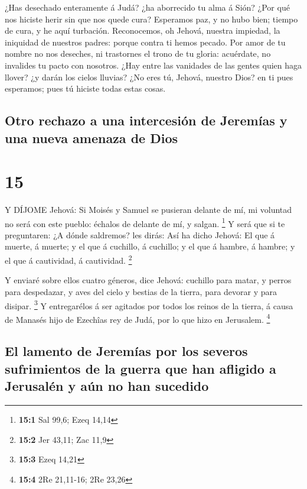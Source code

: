  ¿Has desechado enteramente á Judá? ¿ha aborrecido tu alma
á Sión? ¿Por qué nos hiciste herir sin que nos quede cura? Esperamos
paz, y no hubo bien; tiempo de cura, y he aquí turbación. 
Reconocemos, oh Jehová, nuestra impiedad, la iniquidad de nuestros
padres: porque contra ti hemos pecado.  Por amor de tu
nombre no nos deseches, ni trastornes el trono de tu gloria: acuérdate,
no invalides tu pacto con nosotros.  ¿Hay entre las
vanidades de las gentes quien haga llover? ¿y darán los cielos lluvias?
¿No eres tú, Jehová, nuestro Dios? en ti pues esperamos; pues tú hiciste
todas estas cosas.

\hypertarget{otro-rechazo-a-una-intercesiuxf3n-de-jeremuxedas-y-una-nueva-amenaza-de-dios}{%
\subsection{Otro rechazo a una intercesión de Jeremías y una nueva
amenaza de
Dios}\label{otro-rechazo-a-una-intercesiuxf3n-de-jeremuxedas-y-una-nueva-amenaza-de-dios}}

\hypertarget{section-14}{%
\section{15}\label{section-14}}

 Y DÍJOME Jehová: Si Moisés y Samuel se pusieran delante de
mí, mi voluntad no será con este pueblo: échalos de delante de mí, y
salgan. \footnote{\textbf{15:1} Sal 99,6; Ezeq 14,14}  Y
será que si te preguntaren: ¿A dónde saldremos? les dirás: Así ha dicho
Jehová: El que á muerte, á muerte; y el que á cuchillo, á cuchillo; y el
que á hambre, á hambre; y el que á cautividad, á cautividad. \footnote{\textbf{15:2}
  Jer 43,11; Zac 11,9}

 Y enviaré sobre ellos cuatro géneros, dice Jehová: cuchillo
para matar, y perros para despedazar, y aves del cielo y bestias de la
tierra, para devorar y para disipar. \footnote{\textbf{15:3} Ezeq 14,21}
 Y entregarélos á ser agitados por todos los reinos de la
tierra, á causa de Manasés hijo de Ezechîas rey de Judá, por lo que hizo
en Jerusalem. \footnote{\textbf{15:4} 2Re 21,11-16; 2Re 23,26}

\hypertarget{el-lamento-de-jeremuxedas-por-los-severos-sufrimientos-de-la-guerra-que-han-afligido-a-jerusaluxe9n-y-auxfan-no-han-sucedido}{%
\subsection{El lamento de Jeremías por los severos sufrimientos de la
guerra que han afligido a Jerusalén y aún no han
sucedido}\label{el-lamento-de-jeremuxedas-por-los-severos-sufrimientos-de-la-guerra-que-han-afligido-a-jerusaluxe9n-y-auxfan-no-han-sucedido}}

